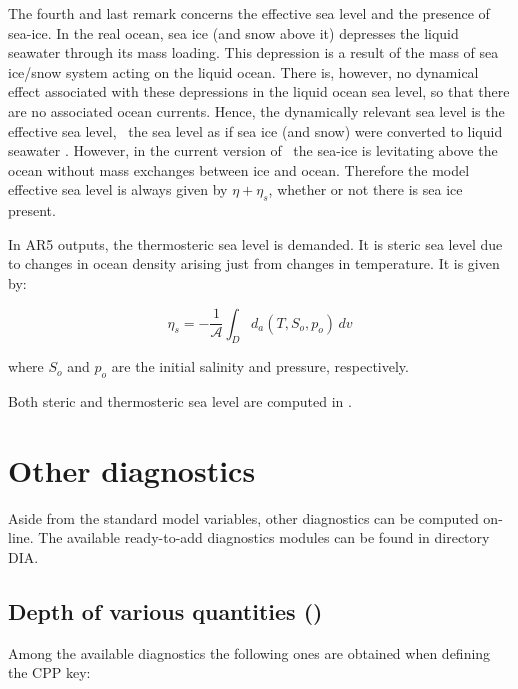 \documentclass[../main/NEMO_manual]{subfiles}
\begin{document}
The fourth and last remark concerns the effective sea level and the presence of sea-ice.
In the real ocean, sea ice (and snow above it)  depresses the liquid seawater through its mass loading.
This depression is a result of the mass of sea ice/snow system acting on the liquid ocean.
There is, however, no dynamical effect associated with these depressions in the liquid ocean sea level,
so that there are no associated ocean currents.
Hence, the dynamically relevant sea level is the effective sea level,
\ie\ the sea level as if sea ice (and snow) were converted to liquid seawater \citep{campin.marshall.ea_OM08}.
However, in the current version of \NEMO\ the sea-ice is levitating above the ocean without mass exchanges between
ice and ocean.
Therefore the model effective sea level is always given by $\eta + \eta_s$, whether or not there is sea ice present.

In AR5 outputs, the thermosteric sea level is demanded.
It is steric sea level due to changes in ocean density arising just from changes in temperature.
It is given by:

\[
  \eta_s = - \frac{1}{\mathcal{A}} \int_D d_a(T,S_o,p_o) \,dv
\]

where $S_o$ and $p_o$ are the initial salinity and pressure, respectively.

Both steric and thermosteric sea level are computed in .

\section{Other diagnostics}
\label{sec:DIA_diag_others}

Aside from the standard model variables, other diagnostics can be computed on-line.
The available ready-to-add diagnostics modules can be found in directory DIA.

\subsection[Depth of various quantities (\textit{diahth.F90})]{Depth of various quantities (\protect{})}

Among the available diagnostics the following ones are obtained when defining the  CPP key:
\end{document}
